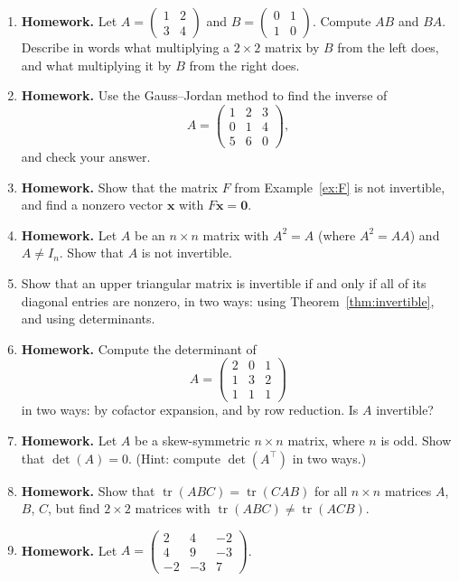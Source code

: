 \documentclass[11pt]{article}
\newcommand{\homework}{\textcolor{red!70!black}{\textbf{Homework.}}}
\theoremstyle{definition}
\theoremstyle{plain}
\theoremstyle{remark}
\DeclareMathOperator{\tr}{tr}
\begin{document}
\begin{enumerate}[leftmargin=*]
	\item \homework{} Let $A = \begin{pmatrix} 1 & 2 \\ 3 & 4 \end{pmatrix}$ and $B = \begin{pmatrix} 0 & 1 \\ 1 & 0 \end{pmatrix}$. Compute $AB$ and $BA$. Describe in words what multiplying a $2 \times 2$ matrix by $B$ from the left does, and what multiplying it by $B$ from the right does.
	\item \homework{} Use the Gauss--Jordan method to find the inverse of
	\[A = \begin{pmatrix}
		1 & 2 & 3 \\
		0 & 1 & 4 \\
		5 & 6 & 0
	\end{pmatrix},\]
	and check your answer.
	\item \homework{} Show that the matrix $F$ from Example~\ref{ex:F} is not invertible, and find a nonzero vector $\mathbf{x}$ with $F\mathbf{x} = \mathbf{0}$.
	\item \homework{} Let $A$ be an $n \times n$ matrix with $A^2 = A$ (where $A^2 = AA$) and $A \neq I_n$. Show that $A$ is not invertible.
	\item Show that an upper triangular matrix is invertible if and only if all of its diagonal entries are nonzero, in two ways: using Theorem~\ref{thm:invertible}, and using determinants.
	\item \homework{} Compute the determinant of
	\[A = \begin{pmatrix}
		2 & 0 & 1 \\
		1 & 3 & 2 \\
		1 & 1 & 1
	\end{pmatrix}\]
	in two ways: by cofactor expansion, and by row reduction. Is $A$ invertible?
	\item \homework{} Let $A$ be a skew-symmetric $n \times n$ matrix, where $n$ is odd. Show that $\det(A) = 0$. (Hint: compute $\det(A^\top)$ in two ways.)
	\item \homework{} Show that $\tr(ABC) = \tr(CAB)$ for all $n \times n$ matrices $A$, $B$, $C$, but find $2 \times 2$ matrices with $\tr(ABC) \neq \tr(ACB)$.
	\item \homework{} Let $A = \begin{pmatrix} 2 & 4 & -2 \\ 4 & 9 & -3 \\ -2 & -3 & 7 \end{pmatrix}$.

\end{enumerate}
\end{document}
